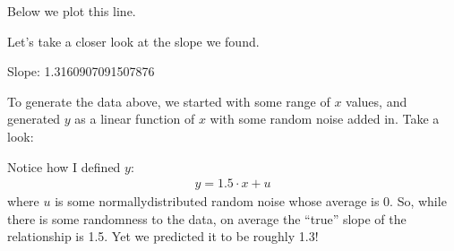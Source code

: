 \documentclass[letterpaper,10pt,english]{jupyterBook}
\begin{document}
\sphinxAtStartPar
Below we plot this line.

\begin{sphinxVerbatim}[commandchars=\\\{\}]
   
      
      
\end{sphinxVerbatim}

\noindent{}

\sphinxAtStartPar
Let’s take a closer look at the slope we found.

\begin{sphinxVerbatim}[commandchars=\\\{\}]
Slope:  1.3160907091507876
\end{sphinxVerbatim}

\sphinxAtStartPar
To generate the data above, we started with some range of \(x\) values, and generated \(y\) as a linear function of \(x\) with some random noise added in. Take a look:

\begin{sphinxVerbatim}[commandchars=\\\{\}]
    
    
      
\end{sphinxVerbatim}

\sphinxAtStartPar
Notice how I defined \(y\):
\begin{equation*}
\begin{split}
y = 1.5 \cdot x + u
\end{split}
\end{equation*}
\sphinxAtStartPar
where \(u\) is some normally\sphinxhyphen{}distributed random noise whose average is 0. So, while there is some randomness to the data, on average the “true” slope of the relationship is 1.5. Yet we predicted it to be roughly 1.3!
\end{document}
